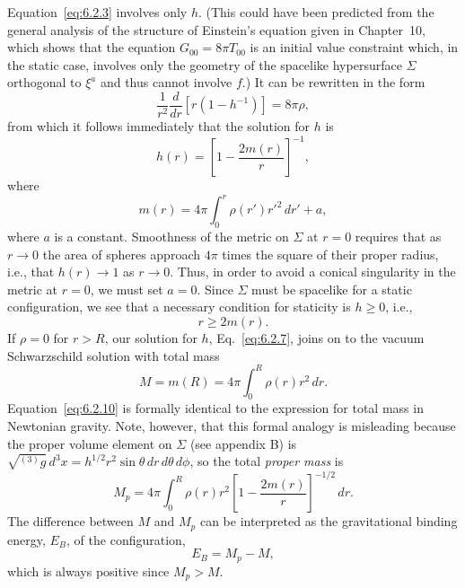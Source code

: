 Equation~\eqref{eq:6.2.3} involves only \(h\). (This could have been predicted
from the general analysis of the structure of Einstein's equation given in
Chapter~10, which shows that the equation \(G_{00}=8\pi T_{00}\) is an initial
value constraint which, in the static case, involves only the geometry of the
spacelike hypersurface \(\Sigma\) orthogonal to \(\xi^a\) and thus cannot involve
\(f\).) It can be rewritten in the form
\begin{equation}
  \frac{1}{r^2}\frac{d}{dr}\left[r(1-h^{-1})\right]=8\pi\rho,
  \tag{6.2.6}\label{eq:6.2.6}
\end{equation}
from which it follows immediately that the solution for \(h\) is
\begin{equation}
  h(r)=\left[1-\frac{2m(r)}{r}\right]^{-1},
  \tag{6.2.7}\label{eq:6.2.7}
\end{equation}
where
\begin{equation}
  m(r)=4\pi\int_0^r\rho(r')r'^2\,dr'+a,
  \tag{6.2.8}\label{eq:6.2.8}
\end{equation}
where \(a\) is a constant. Smoothness of the metric on \(\Sigma\) at \(r=0\)
requires that as \(r\to0\) the area of spheres approach \(4\pi\) times the square
of their proper radius, i.e., that \(h(r)\to1\) as \(r\to0\). Thus, in order to
avoid a conical singularity in the metric at \(r=0\), we must set \(a=0\). Since
\(\Sigma\) must be spacelike for a static configuration, we see that a necessary
condition for staticity is \(h\geq0\), i.e.,
\begin{equation}
  r\geq2m(r).
  \tag{6.2.9}\label{eq:6.2.9}
\end{equation}
If \(\rho=0\) for \(r>R\), our solution for \(h\), Eq.~\eqref{eq:6.2.7}, joins on
to the vacuum Schwarzschild solution with total mass
\begin{equation}
  M=m(R)=4\pi\int_0^R\rho(r)r^2\,dr.
  \tag{6.2.10}\label{eq:6.2.10}
\end{equation}
Equation~\eqref{eq:6.2.10} is formally identical to the expression for total
mass in Newtonian gravity. Note, however, that this formal analogy is misleading
because the proper volume element on \(\Sigma\) (see appendix B) is
\(\sqrt{{}^{(3)}g}\,d^3x=h^{1/2}r^2\sin\theta\,dr\,d\theta\,d\phi\), so the total
\emph{proper mass} is
\begin{equation}
  M_p=4\pi\int_0^R\rho(r)r^2
  \left[1-\frac{2m(r)}{r}\right]^{-1/2}\,dr.
  \tag{6.2.11}\label{eq:6.2.11}
\end{equation}
The difference between \(M\) and \(M_p\) can be interpreted as the gravitational
binding energy, \(E_B\), of the configuration,
\begin{equation}
  E_B=M_p-M,
  \tag{6.2.12}\label{eq:6.2.12}
\end{equation}
which is always positive since \(M_p>M\).


